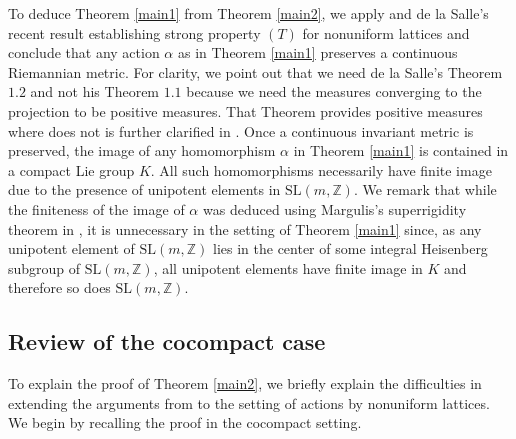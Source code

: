 \documentclass[10pt,reqno]{amsart}
\theoremstyle{Theorem}
\theoremstyle{definition}
\theoremstyle{remark}
\newcommand{\note}[1]{\marginpar{{\color{red}\footnotesize \begin{spacing}{1}#1\end{spacing}}}}
\newcommand{\Z}{\mathbb {Z}}
\newcommand{\Sl}{\mathrm{SL}}
\def\red{\color{red}}
\begin{document}
To deduce Theorem \ref{main1} from  Theorem \ref{main2}, we apply \cite[Theorem 2.9]{BFH} and de la Salle's recent result establishing  strong property $(T)$ for nonuniform lattices  \cite[Theorem 1.2]{delaSallenonuniform} and  conclude that any action $\alpha$ as  in Theorem \ref{main1}  preserves a continuous Riemannian metric.  For clarity, we point out that we need de la Salle's Theorem $1.2$ and not his Theorem $1.1$ because we need the measures converging to the projection to be positive measures.  That Theorem \cite[Theorem 1.2]{delaSallenonuniform} provides positive measures where \cite[Theorem 1.1]{delaSallenonuniform} does not is further clarified in \cite[Section 2.3]{delaSallenonuniform}.   Once a continuous invariant metric is preserved, the   image of any homomorphism $\alpha$  in Theorem \ref{main1} is contained in  a compact Lie group $K$.  All such homomorphisms necessarily  have finite image due to the presence of unipotent elements in $\Sl(m,\Z)$.  We remark that  while the finiteness of the image of $\alpha$  was deduced using Margulis's superrigidity theorem in  \cite{BFH},  it is unnecessary in the setting  of Theorem \ref{main1} since, as  any unipotent element of $\Sl(m,\Z)$ lies in the center of some integral Heisenberg subgroup of $\Sl(m,\Z)$, all unipotent elements have finite image in $K$ and therefore so does $\Sl(m,\Z)$. %


\subsection{Review of the cocompact case} To explain the proof of Theorem \ref{main2}, we briefly  explain the   difficulties in extending the arguments from \cite{BFH} to the setting of actions by nonuniform lattices.  We begin by recalling the proof in the cocompact setting.

\end{document}
